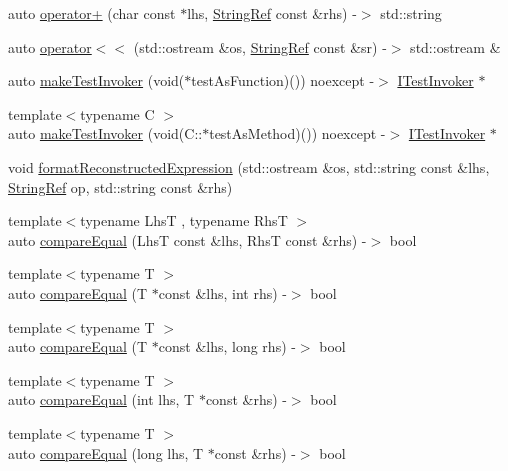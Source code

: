 \begin{DoxyCompactItemize}
\item 
auto \mbox{\hyperlink{namespaceCatch_a764a678121fa11c590a53618baa47680}{operator+}} (char const $\ast$lhs, \mbox{\hyperlink{classCatch_1_1StringRef}{String\+Ref}} const \&rhs) -\/$>$ std\+::string
\item 
auto \mbox{\hyperlink{namespaceCatch_a5e37b333d756a28e12d44977f063af43}{operator$<$$<$}} (std\+::ostream \&os, \mbox{\hyperlink{classCatch_1_1StringRef}{String\+Ref}} const \&sr) -\/$>$ std\+::ostream \&
\item 
auto \mbox{\hyperlink{namespaceCatch_ab3d8ccbc900fe50322c39ecbba52f536}{make\+Test\+Invoker}} (void($\ast$test\+As\+Function)()) noexcept -\/$>$ \mbox{\hyperlink{structCatch_1_1ITestInvoker}{I\+Test\+Invoker}} $\ast$
\item 
{\footnotesize template$<$typename C $>$ }\\auto \mbox{\hyperlink{namespaceCatch_a82a954c4d70afa716115820dc7dc8d24}{make\+Test\+Invoker}} (void(C\+::$\ast$test\+As\+Method)()) noexcept -\/$>$ \mbox{\hyperlink{structCatch_1_1ITestInvoker}{I\+Test\+Invoker}} $\ast$
\item 
void \mbox{\hyperlink{namespaceCatch_a520110c31f26cf9892595772ab814fc0}{format\+Reconstructed\+Expression}} (std\+::ostream \&os, std\+::string const \&lhs, \mbox{\hyperlink{classCatch_1_1StringRef}{String\+Ref}} op, std\+::string const \&rhs)
\item 
{\footnotesize template$<$typename LhsT , typename RhsT $>$ }\\auto \mbox{\hyperlink{namespaceCatch_af89b8df30cfaf09abd048c6ff67359ee}{compare\+Equal}} (LhsT const \&lhs, RhsT const \&rhs) -\/$>$ bool
\item 
{\footnotesize template$<$typename T $>$ }\\auto \mbox{\hyperlink{namespaceCatch_a68f451c45e65f242dde5f21c19a4cf7a}{compare\+Equal}} (T $\ast$const \&lhs, int rhs) -\/$>$ bool
\item 
{\footnotesize template$<$typename T $>$ }\\auto \mbox{\hyperlink{namespaceCatch_afca4a005e1053c542462dc7a603b41b3}{compare\+Equal}} (T $\ast$const \&lhs, long rhs) -\/$>$ bool
\item 
{\footnotesize template$<$typename T $>$ }\\auto \mbox{\hyperlink{namespaceCatch_a6af99378569fc6f68270b6af669f1c3b}{compare\+Equal}} (int lhs, T $\ast$const \&rhs) -\/$>$ bool
\item 
{\footnotesize template$<$typename T $>$ }\\auto \mbox{\hyperlink{namespaceCatch_a72f10ec2cad6db16029d48c8c1d9df2f}{compare\+Equal}} (long lhs, T $\ast$const \&rhs) -\/$>$ bool

\end{DoxyCompactItemize}
